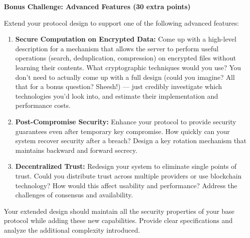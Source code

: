 \documentclass[10pt,a4paper,american]{exam}
\begin{document}
\begin{tcolorbox}[colframe=EarthBrown!30!white,colback=EarthBrown!5!white]
	\textbf{Bonus Challenge: Advanced Features (30 extra points)}

	Extend your protocol design to support one of the following advanced features:

	\begin{enumerate}
		\item \textbf{Secure Computation on Encrypted Data:} Come up with a high-level description for a mechanism that allows the server to perform useful operations (search, deduplication, compression) on encrypted files without learning their contents. What cryptographic techniques would you use? You don't need to actually come up with a full design (could you imagine? All that for a bonus question? Sheesh!) — just credibly investigate which technologies you'd look into, and estimate their implementation and performance costs.

		\item \textbf{Post-Compromise Security:} Enhance your protocol to provide security guarantees even after temporary key compromise. How quickly can your system recover security after a breach? Design a key rotation mechanism that maintains backward and forward secrecy.

		\item \textbf{Decentralized Trust:} Redesign your system to eliminate single points of trust. Could you distribute trust across multiple providers or use blockchain technology? How would this affect usability and performance? Address the challenges of consensus and availability.
	\end{enumerate}

	Your extended design should maintain all the security properties of your base protocol while adding these new capabilities. Provide clear specifications and analyze the additional complexity introduced.
\end{tcolorbox}
\end{document}
